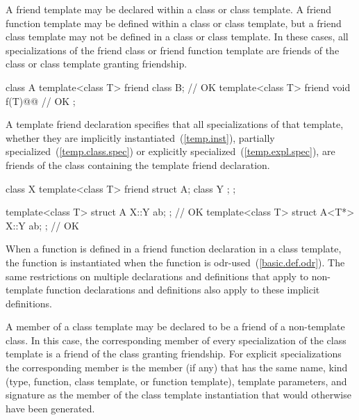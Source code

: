 \pnum
A friend template may be declared within a class or class template.
A friend function template may be defined within a class or class
template, but a friend class template may not be defined in a class
or class template.
In these cases, all specializations of the friend class or friend function
template are friends of the class or class template granting friendship.
\enterexample

\begin{codeblock}
class A {
  template<class T> friend class B;                 // OK
  template<class T> friend void f(T)@@  // OK
};
\end{codeblock}
\exitexample

\pnum
A template friend declaration specifies that all specializations of that
template, whether they are implicitly instantiated~(\ref{temp.inst}), partially
specialized~(\ref{temp.class.spec}) or explicitly specialized~(\ref{temp.expl.spec}),
are friends of the class containing the template friend declaration.
\enterexample

\begin{codeblock}
class X {
  template<class T> friend struct A;
  class Y { };
};

template<class T> struct A { X::Y ab; };            // OK
template<class T> struct A<T*> { X::Y ab; };        // OK
\end{codeblock}
\exitexample

\pnum
When a function is defined in a friend function declaration in a class
template, the function is instantiated when the function is
odr-used~(\ref{basic.def.odr}). The
same restrictions on multiple declarations and definitions that apply
to non-template function declarations and definitions also apply to
these implicit definitions.

\pnum
A member of a class template may be declared to be a friend of a
non-template class.
In this case, the corresponding member of every specialization of
the class template is a friend of the class granting friendship.
For explicit specializations the corresponding member is the member (if any)
that has the same name, kind (type, function, class template, or function
template), template parameters, and signature as the member of the class
template instantiation that would otherwise have been generated.
\enterexample

